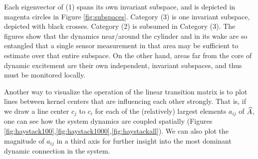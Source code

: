 Each eigenvector of (1) spans its own invariant subspace, and is depicted in magenta circles in Figure \ref{fig:subspaces}. Category (3) is one invariant subspace, depicted with black crosses. Category (2) is subsumed in Category (3). The figures show that the dynamics near/around the cylinder and in its wake are so entangled that a single sensor measurement in that area may be sufficient to estimate over that entire subspace. On the other hand, areas far from the core of dynamic excitement are their own independent, invariant subspaces, and thus must be monitored locally.

Another way to visualize the operation of the linear transition matrix is to plot lines between kernel centers that are influencing each other strongly. That is, if we draw a line center $c_j$ to $c_i$ for each of the (relatively) largest elements $a_{ij}$ of $\widehat{A}$, one can see how the system dynamics are coupled spatially (Figures \ref{fig:haystack100},\ref{fig:haystack1000},\ref{fig:haystackall}). We can also plot the magnitude of $a_{ij}$ in a third axis for further insight into the most dominant dynamic connection in the system.












